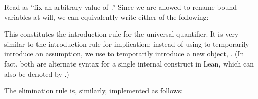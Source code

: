 \documentclass[letterpaper,10pt,english]{sphinxmanual}
\begin{document}
\sphinxAtStartPar
Read  as “fix an arbitrary value  of .”
Since we are allowed to rename bound variables at will,
we can equivalently write either of the following:

\begin{sphinxVerbatim}[commandchars=\\\{\}]
   
     

      
  
    

      
  
    
\end{sphinxVerbatim}

\sphinxAtStartPar
This constitutes the introduction rule for the universal quantifier.
It is very similar to the introduction rule for implication:
instead of using  to temporarily introduce an assumption,
we use  to temporarily introduce a new object, . (In fact,
both are alternate syntax for a single internal construct in Lean, which can also be denoted by .)

\sphinxAtStartPar
The elimination rule is, similarly, implemented as follows:

\begin{sphinxVerbatim}[commandchars=\\\{\}]
   
     
      
   

    
     
\end{sphinxVerbatim}
\end{document}
